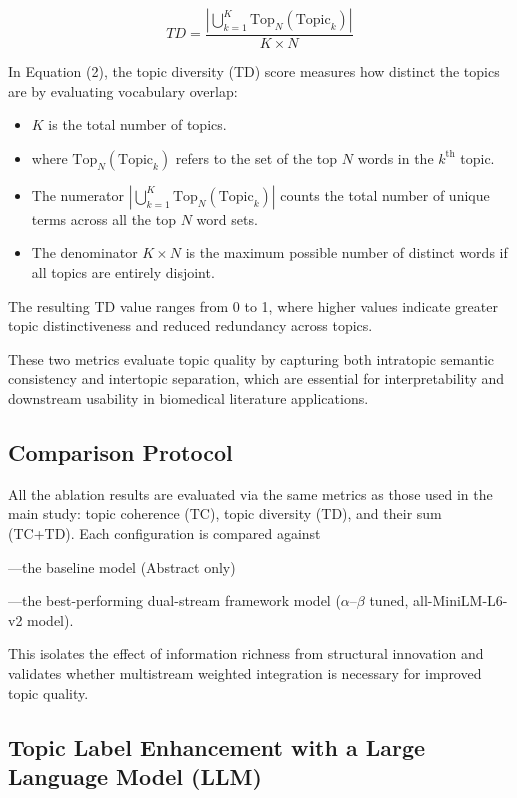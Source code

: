 \documentclass[authorproof,JACIII,researchpaper]{fujipressarticle}
\begin{document}
\begin{equation}
TD = \frac{\left|\bigcup_{k=1}^{K} \text{Top}_N(\text{Topic}_k)\right|}{K \times N}
\end{equation}

In Equation (2), the topic diversity (TD) score measures how distinct the topics are by evaluating vocabulary overlap:

\begin{itemize}
    \item $K$ is the total number of topics.

    \item where $\text{Top}_N(\text{Topic}_k)$ refers to the set of the top $N$ words in the $k^{\text{th}}$ topic.

    \item The numerator $\left|\bigcup_{k=1}^{K} \text{Top}_N(\text{Topic}_k)\right|$ counts the total number of unique terms across all the top $N$ word sets.

    \item The denominator $K \times N$ is the maximum possible number of distinct words if all topics are entirely disjoint.
\end{itemize}

The resulting TD value ranges from 0 to 1, where higher values indicate greater topic distinctiveness and reduced redundancy across topics.

These two metrics evaluate topic quality by capturing both intratopic semantic consistency and intertopic separation, which are essential for interpretability and downstream usability in biomedical literature applications.

\subsection{Comparison Protocol}
All the ablation results are evaluated via the same metrics as those used in the main study: topic coherence (TC), topic diversity (TD), and their sum (TC+TD). Each configuration is compared against

---the baseline model (Abstract only)

---the best-performing dual-stream framework model ($\alpha$--$\beta$ tuned, all-MiniLM-L6-v2 model).

This isolates the effect of information richness from structural innovation and validates whether multistream weighted integration is necessary for improved topic quality.

\subsection{Topic Label Enhancement with a Large Language Model (LLM)}
\end{document}
